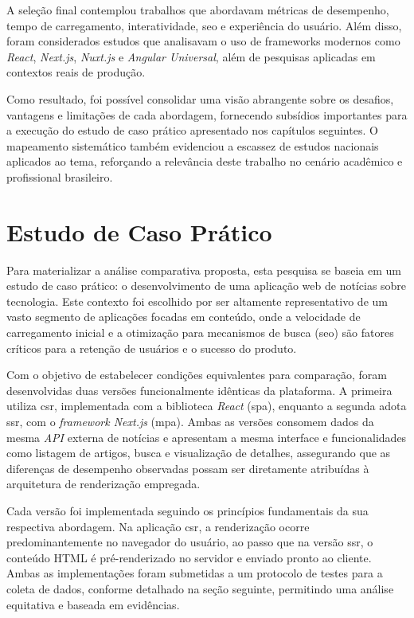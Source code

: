 A seleção final contemplou trabalhos que abordavam métricas de desempenho, tempo de carregamento, interatividade, \acrshort{seo} e experiência do usuário. Além disso, foram considerados estudos que analisavam o uso de frameworks modernos como \textit{React}, \textit{Next.js}, \textit{Nuxt.js} e \textit{Angular Universal}, além de pesquisas aplicadas em contextos reais de produção.

Como resultado, foi possível consolidar uma visão abrangente sobre os desafios, vantagens e limitações de cada abordagem, fornecendo subsídios importantes para a execução do estudo de caso prático apresentado nos capítulos seguintes. O mapeamento sistemático também evidenciou a escassez de estudos nacionais aplicados ao tema, reforçando a relevância deste trabalho no cenário acadêmico e profissional brasileiro.


\section{Estudo de Caso Prático}
\label{sec:estudo-de-caso-pratico}

Para materializar a análise comparativa proposta, esta pesquisa se baseia em um estudo de caso prático: o desenvolvimento de uma aplicação web de notícias sobre tecnologia. Este contexto foi escolhido por ser altamente representativo de um vasto segmento de aplicações focadas em conteúdo, onde a velocidade de carregamento inicial e a otimização para mecanismos de busca (\acrshort{seo}) são fatores críticos para a retenção de usuários e o sucesso do produto.

Com o objetivo de estabelecer condições equivalentes para comparação, foram desenvolvidas duas versões funcionalmente idênticas da plataforma. A primeira utiliza \acrfull{csr}, implementada com a biblioteca \textit{React} (\acrshort{spa}), enquanto a segunda adota \acrfull{ssr}, com o \textit{framework Next.js} (\acrshort{mpa}). Ambas as versões consomem dados da mesma \textit{API} externa de notícias e apresentam a mesma interface e funcionalidades como listagem de artigos, busca e visualização de detalhes, assegurando que as diferenças de desempenho observadas possam ser diretamente atribuídas à arquitetura de renderização empregada.

Cada versão foi implementada seguindo os princípios fundamentais da sua respectiva abordagem. Na aplicação \acrshort{csr}, a renderização ocorre predominantemente no navegador do usuário, ao passo que na versão \acrshort{ssr}, o conteúdo HTML é pré-renderizado no servidor e enviado pronto ao cliente. Ambas as implementações foram submetidas a um protocolo de testes para a coleta de dados, conforme detalhado na seção seguinte, permitindo uma análise equitativa e baseada em evidências.


